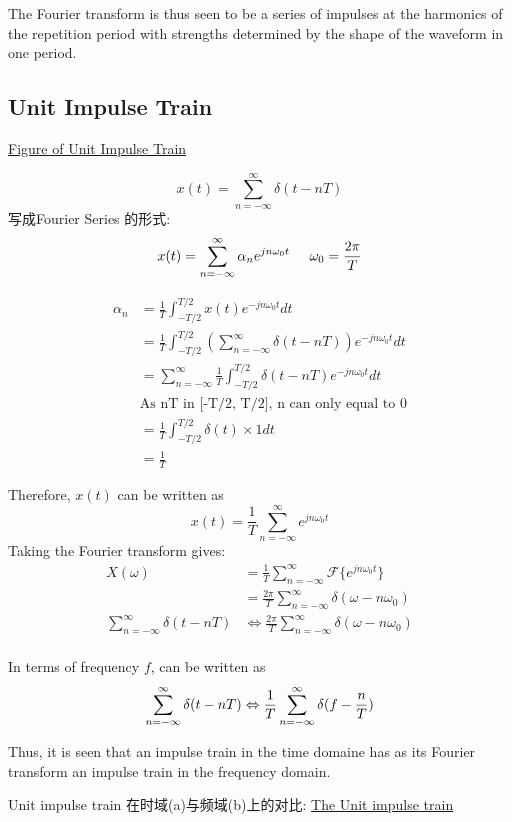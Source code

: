 \documentclass{article}
\begin{document}
The Fourier transform is thus seen to be a series of impulses at the harmonics of the repetition period with strengths determined by the shape of the waveform in one period.

\subsection{Unit Impulse Train}
\href{http://upload.wikimedia.org/wikipedia/commons/thumb/4/49/Dirac\_comb.svg/300px-Dirac\_comb.svg.png}{Figure of Unit Impulse Train}

$$x(t) = \sum_{n = - \infty}^{\infty} \delta(t - nT)$$
写成Fourier Series 的形式:
$$x(t) = \sum_{n = - \infty}^{\infty} \alpha_n e^{jn\omega_0 t} \hspace{0.5cm} \omega_0 = \frac{2\pi}{T}$$

$$
\begin{aligned}
		\alpha_n & = \frac{1}{T} \int_{ - T/2}^{T/2} x(t) e^{-jn\omega_0 t}dt \\
				& = \frac{1}{T} \int_{ - T/2}^{T/2} (\sum_{n = - \infty}^{\infty} \delta(t - nT)) e^{-jn\omega_0 t}dt \\
				& = \sum_{n=-\infty}^{\infty} \frac{1}{T} \int_{ - T/2}^{T/2} \delta(t - nT) e^{-jn\omega_0 t}dt \\
			 	&\text{As nT in [-T/2, T/2], n can only equal to 0}\\
				 &= \frac{1}{T} \int_{-T/2}^{T/2} \delta(t) \times 1 dt \\
				 & = \frac{1}{T}
\end{aligned}
$$

Therefore, $x(t)$ can be written as
$$ x(t) = \frac{1}{T} \sum_{n = - \infty}^{\infty} e^{jn\omega_0 t} $$
Taking the Fourier transform gives:
\begin{equation}
\begin{aligned}
X(\omega)
& = \frac{1}{T} \sum_{n = -\infty}^{\infty} \mathcal{F}\{ e^{jn\omega_0 t} \} \\
& = \frac{2\pi}{T} \sum_{n = -\infty}^{\infty} \delta(\omega - n\omega_0) \\
\sum_{n = - \infty}^{\infty} \delta(t - nT)
& \Leftrightarrow
\frac{2\pi}{T} \sum_{n = -\infty}^{\infty} \delta(\omega - n\omega_0) \\
\end{aligned}
\end{equation}

In terms of frequency $f$, \lasteq can be written as
$$
\sum_{n = - \infty}^{\infty} \delta(t - nT)
\Leftrightarrow
\frac{1}{T} \sum_{n = -\infty}^{\infty} \delta(f - \dfrac{n}{T}) \\
$$

Thus, it is seen that an impulse train in the time domaine has as its Fourier transform an impulse train in the frequency domain.

Unit impulse train 在时域(a)与频域(b)上的对比:
\href{http://i.imgbox.com/GHbA7Fbm.jpg}{The Unit impulse train}
\end{document}
